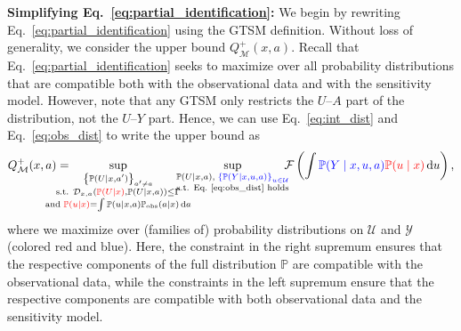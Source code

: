 \documentclass{article} %
\newcommand*\diff{\mathop{}\!\mathrm{d}}
\theoremstyle{definition}
\theoremstyle{plain}
\begin{document}
\textbf{Simplifying Eq.~\eqref{eq:partial_identification}:} We begin by rewriting Eq.~\eqref{eq:partial_identification} using the GTSM definition. Without loss of generality, we consider the upper bound $Q^+_\mathcal{M}(x, a)$. Recall that Eq.~\eqref{eq:partial_identification} seeks to maximize over all probability distributions that are compatible both with the observational data and with the sensitivity model. However, note that any GTSM only restricts the $U$--$A$ part of the distribution, not the $U$--$Y$ part. Hence, we can use Eq.~\eqref{eq:int_dist} and Eq.~\eqref{eq:obs_dist} to write the upper bound as
\begin{equation}\label{eq:alternating_opt}
Q^+_\mathcal{M}(x, a) = \hspace{-0.8cm} 
    \sup_{\color{black}\substack{\left\{\mathbb{P}(U \mid x, a^\prime)\right\}_{a^\prime \neq a} \color{black} \\ \text{s.t. }\mathcal{D}_{x, a}(\color{red}\mathbb{P}(U \mid x) \color{black}, \mathbb{P}(U \mid x, a)) \leq \Gamma \\ \text{and } \color{red}\mathbb{P}(u \mid x) \color{black}  = \int \mathbb{P}(u \mid x, a) \color{black} \mathbb{P}_\mathrm{obs}(a \mid x) \diff a}} 
    \hspace{-0.5cm}
    \color{black}\sup_{\substack{\mathbb{P}(U \mid x, a), \; \color{blue} \left\{\mathbb{P}(Y \mid x, u, a)\right\}_{u \in \mathcal{U}} \color{black} \\ \text{s.t. Eq.~\eqref{eq:obs_dist} holds}}}
    \hspace{-0.2cm}
    \mathcal{F} \left(\int \color{blue} \mathbb{P}(Y \mid x, u, a) \color{red} \mathbb{P}(u \mid x) \color{black} \diff u\right),
\end{equation}
where we maximize over (families of) probability distributions on $\mathcal{U}$ and $\mathcal{Y}$ (colored \color{red}red \color{black}and \color{blue}blue\color{black}). Here, the constraint in the right supremum ensures that the respective components of the full distribution $\mathbb{P}$ are compatible with the observational data, while the constraints in the left supremum ensure that the respective components are compatible with both observational data and the sensitivity model.
\end{document}
